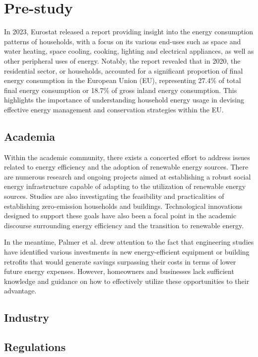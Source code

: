 \chapter{Pre-study} 

In 2023, Eurostat \cite{eurostat} released a report providing insight into the energy consumption patterns of households, with a focus on its various end-uses such as space and water heating, space cooling, cooking, lighting and electrical appliances, as well as other peripheral uses of energy. Notably, the report revealed that in 2020, the residential sector, or households, accounted for a significant proportion of final energy consumption in the European Union (EU), representing 27.4\% of total final energy consumption or 18.7\% of gross inland energy consumption. This highlights the importance of understanding household energy usage in devising effective energy management and conservation strategies within the EU. 


\section{Academia}

Within the academic community, 
there exists a concerted effort to address issues related to energy efficiency and the adoption of renewable energy sources. 
There are numerous research and ongoing projects aimed at establishing a robust social energy infrastructure capable of adapting to the utilization of renewable energy sources. 
Studies are also investigating the feasibility and practicalities of establishing zero-emission households and buildings.
Technological innovations designed to support these goals have also been a focal point in the academic discourse surrounding energy efficiency and the transition to renewable energy.

In the meantime, Palmer et al. \cite{informationgap} drew attention to the fact that engineering studies have identified various investments in new energy-efficient equipment or building retrofits that would generate savings surpassing their costs in terms of lower future energy expenses. However, homeowners and businesses lack sufficient knowledge and guidance on how to effectively utilize these opportunities to their advantage.

\section{Industry}


\section{Regulations}


